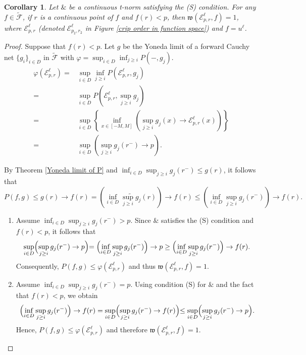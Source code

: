 \documentclass[preprint,3p,times]{elsarticle}
\theoremstyle{plain}
\newtheorem{cor}[thm]{Corollary}
\theoremstyle{definition}
\renewcommand{\phi}{\varphi}
\numberwithin{equation}{section}
\begin{document}
\begin{cor}\label{left branch way below}
	Let \( \& \) be a continuous t-norm satisfying the (S) condition. For any  \(f\in \tilde{\mathcal{F}} \), if \(r\) is a continuous point of \(f\) and \( f(r)<p\), then \(\mathfrak{w}(\mathcal{E}^\ell_{p,r},f)=1\),  where \(\mathcal{E}^\ell_{p,r}\)
(denoted \(\mathcal{E}^\ell_{p_2,r_2}\) in Figure \ref{crip order in function space})
and \(f=u^\ell\).
\end{cor}
\begin{proof}

    Suppose that \(f(r)<p \).
	Let \(g\) be the Yoneda limit of a forward Cauchy net \(\{g_i\}_{i \in D}\) in \(\tilde{\mathcal{F}}\) with \(\phi =\sup_{i\in D} \inf_{j\ge i} P(-,g_j )\). \begin{align*}
		\phi (\mathcal{E}^\ell_{p,r})=& \sup_{i\in D} \inf_{j\ge i} P(\mathcal{E}^\ell_{p,r},g_j )\\
		=&\sup_{i\in D}P(\mathcal{E}^\ell_{p,r}, \sup_{j\ge i}g_j )\\
		=&\sup_{i\in D}\left\{\inf_{x\in [-M,M]} ( \sup_{j\ge i}g_j (x)\rightarrow \mathcal{E}^\ell_{p,r}(x) )\right\}\\
		=&\sup_{i\in D}( \sup_{j\ge i}g_j (r^-) \rightarrow p ).\tag{\(g_j(r^-)\) is the left limit of \(g_j\) at \(x=r\)}
	\end{align*}
	
	By Theorem \ref{Yoneda limit of P} and \(\inf_{i\in D}\sup_{j\ge i}g_j(r^-)\le g(r)\), it follows that \[P(f,g)\le  g(r) \rightarrow f(r)=\left(\inf_{i\in D} \widetilde{\sup_{j\ge i}g_j}(r)\right)\rightarrow f(r)\le \left(\inf_{i\in D}\sup_{j\ge i}g_j(r^-)\right)\rightarrow f(r).\]  

    \begin{enumerate}[label={\rm(\arabic*)}]
    \item Assume \(\displaystyle\inf_{i \in D} \sup_{j \ge i} g_j (r^-) > p\). Since  \(\&\) satisfies the (S) condition and \(f(r) < p\), it follows that
    \[
    \sup_{i \in D} \Bigl( \sup_{j \ge i} g_j (r^-) \to p \Bigl) 
    = \Bigl( \inf_{i \in D} \sup_{j \ge i} g_j (r^-) \Bigr) \to p 
    \ge \Bigl( \inf_{i \in D} \sup_{j \ge i} g_j(r^-) \Bigr) \to f(r).
    \]
    Consequently, \(P(f, g) \le \phi(\mathcal{E}^\ell_{p, r})\) and thus \(\mathfrak{w}(\mathcal{E}^\ell_{p, r}, f) = 1\).

    \item Assume \(\displaystyle\inf_{i \in D} \sup_{j \ge i} g_j (r^-) = p\). Using condition (S) for \(\&\) and the fact that \(f(r) < p\), we obtain
    \[
    \Bigl( \inf_{i \in D} \sup_{j \ge i} g_j(r^-) \Bigr) \to f(r)
    = \sup_{i \in D} \Bigl( \sup_{j \ge i} g_j (r^-) \to f(r) \Bigl)
    \le \sup_{i \in D} \Bigl( \sup_{j \ge i} g_j (r^-) \to p \Bigl).
    \]
    Hence, \(P(f, g) \le \phi(\mathcal{E}^\ell_{p, r})\) and therefore \(\mathfrak{w}(\mathcal{E}^\ell_{p, r}, f) = 1\).


\end{enumerate}
\end{proof}
\end{document}
